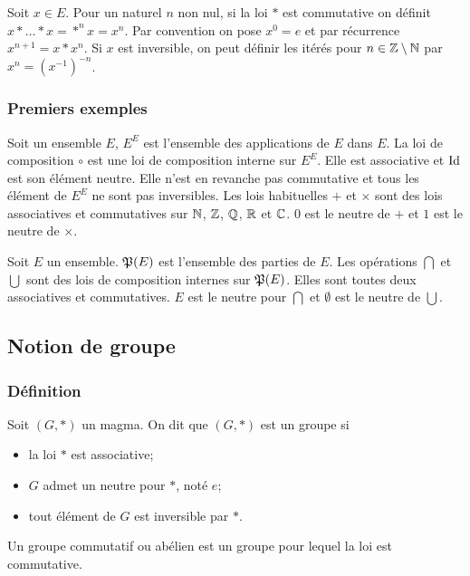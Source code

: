 Soit $x \in E$. Pour un naturel $n$ non nul, si la loi $*$ est commutative on définit $x * \ldots *x = *^{n} x = x^n$. Par convention on pose $x^0=e$ et par récurrence $x^{n+1}=x*x^{n}$. Si $x$ est inversible, on peut définir les itérés pour $n \in \mathbb{Z}\setminus\mathbb{N}$ par $x^n=(x^{-1})^{-n}$.

\subsubsection{Premiers exemples}

Soit un ensemble $E$, $E^E$ est l'ensemble des applications de $E$ dans $E$. La loi de composition $\circ$ est une loi de composition interne sur $E^E$. Elle est associative et $\operatorname{Id}$ est son élément neutre. Elle n'est en revanche pas commutative et tous les élément de $E^E$ ne sont pas inversibles. Les lois habituelles $+$ et $\times$ sont des lois associatives et commutatives sur $\mathbb{N}$, $\mathbb{Z}$, $\mathbb{Q}$, $\mathbb{R}$ et $\mathbb{C}$. $0$ est le neutre de $+$ et $1$ est le neutre de $\times$.

Soit $E$ un ensemble. $\mathfrak{P}(E)$ est l'ensemble des parties de $E$. Les opérations $\bigcap$ et $\bigcup$ sont des lois de composition internes sur $\mathfrak{P}(E)$. Elles sont toutes deux associatives et commutatives. $E$ est le neutre pour $\bigcap$ et $\emptyset$ est le neutre de $\bigcup$.

\subsection{Notion de groupe}

\subsubsection{Définition}

\begin{defdef}
  Soit $(G,*)$ un magma. On dit que $(G,*)$ est un groupe si
  \begin{itemize}
  \item la loi $*$ est associative;
  \item $G$ admet un neutre pour $*$, noté $e$;
  \item tout élément de $G$ est inversible par $*$.
  \end{itemize}
\end{defdef}
\begin{defdef}
  Un groupe commutatif ou abélien est un groupe pour lequel la loi est commutative.
\end{defdef}

